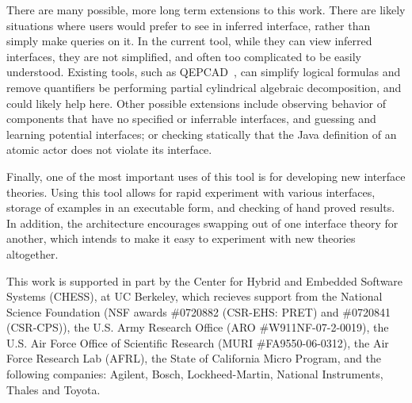 \documentclass[preprint,11pt]{sigplanconf}
\begin{document}
There are many possible, more long term extensions to this work. There are
likely situations where users would prefer to see in inferred interface,
rather than simply make queries on it.  In the current tool, while they can
view inferred interfaces, they are not simplified, and often too complicated to
be easily understood.  Existing tools, such as QEPCAD~\cite{qepcad}, can simplify
logical formulas and remove quantifiers be performing partial cylindrical
algebraic decomposition, and could likely help here. Other possible extensions
include observing behavior of components that have no specified or inferrable
interfaces, and guessing and learning potential interfaces; or checking
statically that the Java definition of an atomic actor does not violate its
interface.

Finally, one of the most important uses of this tool is for developing new
interface theories. Using this tool allows for rapid experiment with various
interfaces, storage of examples in an executable form, and checking of hand
proved results. In addition, the architecture encourages swapping out of one
interface theory for another, which intends to make it easy to experiment with
new theories altogether.

\acks
{} %
This work is supported in part by the Center for Hybrid and Embedded Software
Systems (CHESS), at UC Berkeley, which recieves support from the National Science
Foundation (NSF awards \#0720882 (CSR-EHS: PRET) and \#0720841 (CSR-CPS)), the
U.S. Army Research Office (ARO \#W911NF-07-2-0019), the U.S. Air Force Office of
Scientific Research (MURI \#FA9550-06-0312), the Air Force Research Lab (AFRL),
the State of California Micro Program, and the following companies: Agilent,
Bosch, Lockheed-Martin, National Instruments, Thales and Toyota.
\fi


\end{document}

